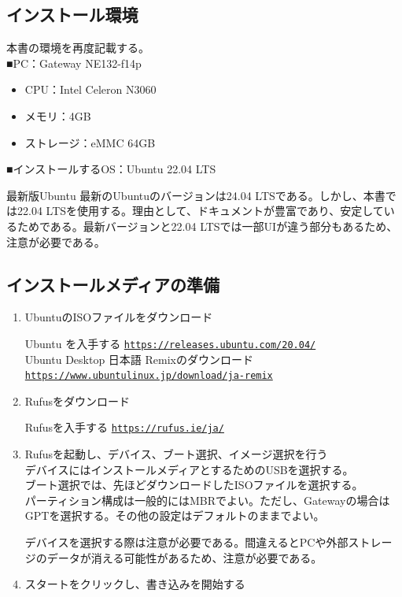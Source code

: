 \documentclass[a4paper, 11pt, dvipdfmx]{jsarticle}
\begin{document}
\subsection{インストール環境}
  本書の環境を再度記載する。\\
  ■PC：Gateway NE132-f14p
  \begin{itemize}
    \item CPU：Intel Celeron N3060
    \item メモリ：4GB
    \item ストレージ：eMMC 64GB
  \end{itemize}
  ■インストールするOS：Ubuntu 22.04 LTS
  \begin{johobox}{最新版Ubuntu}
    最新のUbuntuのバージョンは24.04 LTSである。しかし、本書では22.04 LTSを使用する。理由として、ドキュメントが豊富であり、安定しているためである。最新バージョンと22.04 LTSでは一部UIが違う部分もあるため、注意が必要である。
  \end{johobox}
\subsection{インストールメディアの準備}
  \begin{enumerate}
    \item UbuntuのISOファイルをダウンロード
    \begin{tcolorbox}[blue]
      Ubuntu を入手する \href{https://releases.ubuntu.com/20.04/}{\texttt{https://releases.ubuntu.com/20.04/}}\\
      Ubuntu Desktop 日本語 Remixのダウンロード \href{https://www.ubuntulinux.jp/download/ja-remix}{\texttt{https://www.ubuntulinux.jp/download/ja-remix}}
    \end{tcolorbox}
    \item Rufusをダウンロード
    \begin{tcolorbox}[blue]
      Rufusを入手する \href{https://rufus.ie/ja/}{\texttt{https://rufus.ie/ja/}}
    \end{tcolorbox}
    \item Rufusを起動し、デバイス、ブート選択、イメージ選択を行う\\
    デバイスにはインストールメディアとするためのUSBを選択する。\\
    ブート選択では、先ほどダウンロードしたISOファイルを選択する。\\
    パーティション構成は一般的にはMBRでよい。ただし、Gatewayの場合はGPTを選択する。その他の設定はデフォルトのままでよい。
      \begin{tcolorbox}[yellow]
        デバイスを選択する際は注意が必要である。間違えるとPCや外部ストレージのデータが消える可能性があるため、注意が必要である。
      \end{tcolorbox}
    \item スタートをクリックし、書き込みを開始する
  \end{enumerate}
\end{document}
